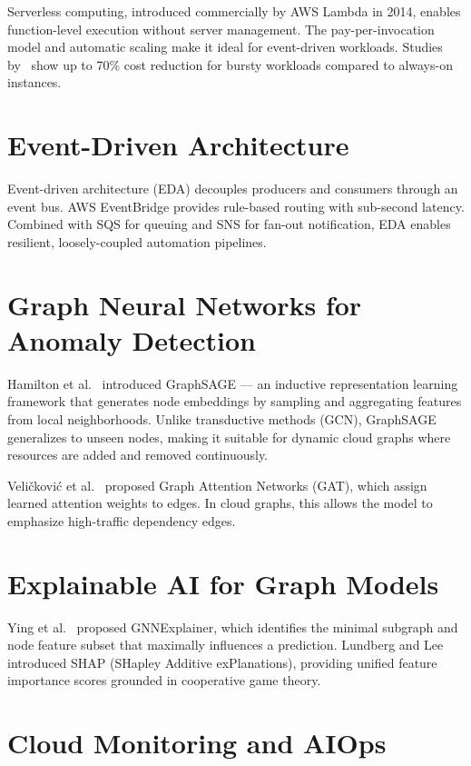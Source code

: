 \documentclass[12pt,a4paper]{report}
\begin{document}
Serverless computing, introduced commercially by AWS Lambda in 2014,
enables function-level execution without server management. The
pay-per-invocation model and automatic scaling make it ideal for
event-driven workloads. Studies by~\cite{baldini2017serverless} show
up to 70\% cost reduction for bursty workloads compared to always-on
instances.

\section{Event-Driven Architecture}

Event-driven architecture (EDA) decouples producers and consumers through
an event bus. AWS EventBridge provides rule-based routing with sub-second
latency. Combined with SQS for queuing and SNS for fan-out notification,
EDA enables resilient, loosely-coupled automation pipelines.

\section{Graph Neural Networks for Anomaly Detection}

Hamilton et al.~\cite{hamilton2017inductive} introduced GraphSAGE —
an inductive representation learning framework that generates node
embeddings by sampling and aggregating features from local neighborhoods.
Unlike transductive methods (GCN), GraphSAGE generalizes to unseen nodes,
making it suitable for dynamic cloud graphs where resources are added and
removed continuously.

Veličković et al.~\cite{velivckovic2018graph} proposed Graph Attention
Networks (GAT), which assign learned attention weights to edges. In cloud
graphs, this allows the model to emphasize high-traffic dependency edges.

\section{Explainable AI for Graph Models}

Ying et al.~\cite{ying2019gnnexplainer} proposed GNNExplainer, which
identifies the minimal subgraph and node feature subset that maximally
influences a prediction. Lundberg and Lee~\cite{lundberg2017unified}
introduced SHAP (SHapley Additive exPlanations), providing unified
feature importance scores grounded in cooperative game theory.

\section{Cloud Monitoring and AIOps}
\end{document}
